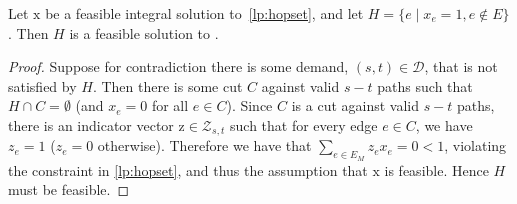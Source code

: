 \begin{lemma}
    Let $\bm{\mathrm{x}}$ be a feasible integral solution to~\ref{lp:hopset}, and let $H = \{ e \; | \; x_e = 1, e \notin E\}$. Then $H$ is a feasible solution to {\hopset}.
\end{lemma}
\begin{proof}
    Suppose for contradiction there is some demand, $(s,t) \in \mathcal{D}$, that is not satisfied by $H$.  Then there is some cut $C$ against valid $s-t$ paths such that $H \cap C = \emptyset$ (and $x_e = 0$ for all $e \in C$). Since $C$ is a cut against valid $s-t$ paths, there is an indicator vector $\bm{\mathrm{z}} \in \mathcal{Z}_{s,t}$ such that for every edge $e \in C$, we have $z_e = 1$ ($z_e = 0$ otherwise). Therefore we have that $\sum_{e \in E_M} z_e x_e = 0 < 1$, violating the constraint in \ref{lp:hopset}, and thus the assumption that $\bm{\mathrm{x}}$ is feasible. Hence $H$ must be feasible.
\end{proof}
\fi



